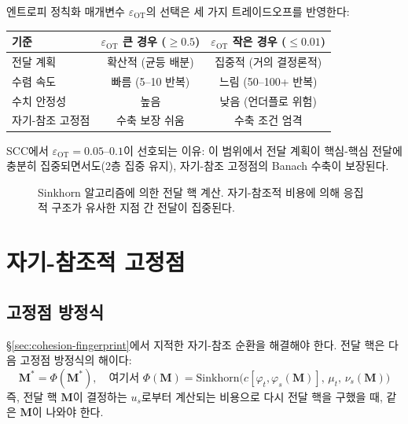 엔트로피 정칙화 매개변수 $\varepsilon_{\mathrm{OT}}$의 선택은 세 가지 트레이드오프를 반영한다:

\begin{center}
\begin{tabular}{lcc}
\hline
\textbf{기준} & $\varepsilon_{\mathrm{OT}}$ \textbf{큰 경우} ($\geq 0.5$) & $\varepsilon_{\mathrm{OT}}$ \textbf{작은 경우} ($\leq 0.01$) \\
\hline
전달 계획 & 확산적 (균등 배분) & 집중적 (거의 결정론적) \\
수렴 속도 & 빠름 (5--10 반복) & 느림 (50--100+ 반복) \\
수치 안정성 & 높음 & 낮음 (언더플로 위험) \\
자기-참조 고정점 & 수축 보장 쉬움 & 수축 조건 엄격 \\
\hline
\end{tabular}
\end{center}

SCC에서 $\varepsilon_{\mathrm{OT}} = 0.05$--$0.1$이 선호되는 이유: 이 범위에서 전달 계획이 핵심-핵심 전달에 충분히 집중되면서도(2층 집중 유지), 자기-참조 고정점의 Banach 수축이 보장된다.

\begin{figure}[t]
\centering
{}
\caption{Sinkhorn 알고리즘에 의한 전달 핵 계산. 자기-참조적 비용에 의해 응집적 구조가 유사한 지점 간 전달이 집중된다.}
\label{fig:sinkhorn-convergence}
\end{figure}


\section{자기-참조적 고정점}
\label{sec:fixed-point}

\subsection{고정점 방정식}

§\ref{sec:cohesion-fingerprint}에서 지적한 자기-참조 순환을 해결해야 한다. 전달 핵은 다음 고정점 방정식의 해이다:
\begin{equation}
    \mathbf{M}^* = \Phi(\mathbf{M}^*), \quad \text{여기서 } \Phi(\mathbf{M}) = \mathrm{Sinkhorn}\big(c[\varphi_t, \varphi_s(\mathbf{M})],\, \mu_t,\, \nu_s(\mathbf{M})\big)
    \label{eq:fixed-point}
\end{equation}
즉, 전달 핵 $\mathbf{M}$이 결정하는 $u_s$로부터 계산되는 비용으로 다시 전달 핵을 구했을 때, 같은 $\mathbf{M}$이 나와야 한다.

